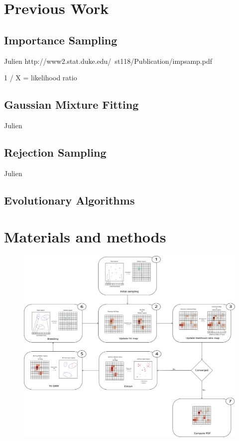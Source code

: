 \documentclass[10pt,letterpaper]{article}
\theoremstyle{definition}
\theoremstyle{remark}
\begin{document}
\section*{Previous Work}

\subsection*{Importance Sampling}

{\color{red} Julien} 
http://www2.stat.duke.edu/~st118/Publication/impsamp.pdf


1 / X = likelihood ratio

\subsection*{Gaussian Mixture Fitting}

{\color{red} Julien} 

\subsection*{Rejection Sampling}

{\color{red} Julien} 

\subsection*{Evolutionary Algorithms}


\section*{Materials and methods}
\label{sec. algoDescription}


\begin{figure}
 \centering
  \includegraphics[width=0.8\linewidth]{images/schemaalgo.pdf}%
\end{figure}
\end{document}
